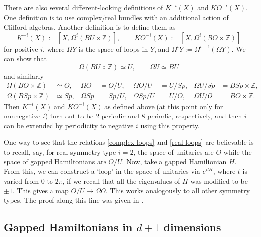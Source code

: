\documentclass[12pt]{article}
\numberwithin{equation}{section}
\numberwithin{figure}{section}
\theoremstyle{remark}
\def\bZ{\mathbb{Z}}
\begin{document}
There are also several different-looking definitions of $K^{-i}(X)$  and $KO^{-i}(X)$.
One definition is to use complex/real bundles with an additional action of Clifford algebras.
Another definition is to define them as \begin{equation}
K^{-i}(X):=[X,\Omega^i (BU\times \bZ)], \qquad
KO^{-i}(X):=[X,\Omega^i (BO\times \bZ)]
\end{equation} for positive $i$, where $\Omega Y$ is the space of loops in $Y$, and $\Omega^iY:=\Omega^{i-1}(\Omega Y)$.
We can show that \begin{equation}
\Omega (BU\times \bZ)\simeq U,\qquad
\Omega U\simeq BU
\label{complex-loops}
\end{equation} and similarly \begin{equation}
\begin{aligned}
\Omega (BO\times \bZ)&\simeq O,&
\Omega O&=O/U,&
\Omega O/U&=U/Sp,&
\Omega U/Sp &=BSp\times \bZ, \\
\Omega (BSp\times \bZ)&\simeq Sp,&
\Omega Sp&=Sp/U,&
\Omega Sp/U&=U/O,&
\Omega U/O &=BO\times \bZ.
\end{aligned}
\label{real-loops}
\end{equation}
Then $K^{-i}(X)$ and $KO^{-i}(X)$ as defined above (at this point only for nonnegative $i$)
 turn out to be 2-periodic and 8-periodic, respectively, and then $i$ can be extended by periodicity to negative $i$
 using this property.
 
One way to see that the relations \eqref{complex-loops} and \eqref{real-loops} are believable
is to recall, say, for real symmetry type $i=2$, the space of unitaries are $O$ while the space of gapped Hamiltonians are $O/U$. 
Now, take a gapped Hamiltonian $H$. From this, we can construct a `loop' in the space of unitaries 
via $e^{itH}$, where $t$ is varied from $0$ to $2\pi$, if we recall that all the eigenvalues of $H$ was
modified to be $\pm1$.
This gives a map $O/U\to \Omega O$. This works analogously to all other symmetry types.
The proof along this line was given in \cite{Wood}.


\subsection{Gapped Hamiltonians in $d+1$ dimensions}
\end{document}
